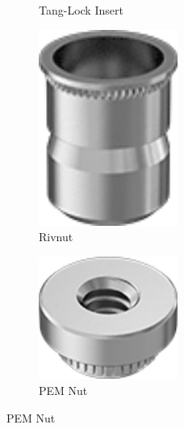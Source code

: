 \documentclass[10pt,letterpaper]{book}
\begin{document}
\begin{figure}[H]
\begin{subfigure}[b]{.24\linewidth}
			\caption{Tang-Lock Insert}
		\end{subfigure}\begin{subfigure}[b]{.24\linewidth}
			\includegraphics[width=0.5\textwidth]{imgs/rivnut.png}
			\caption{Rivnut}
		\end{subfigure}\begin{subfigure}[b]{.24\linewidth}
			\includegraphics[width=0.5\textwidth]{imgs/pemnut.png}
			\caption{PEM Nut}
		\end{subfigure}
		

\end{figure}
\end{document}
